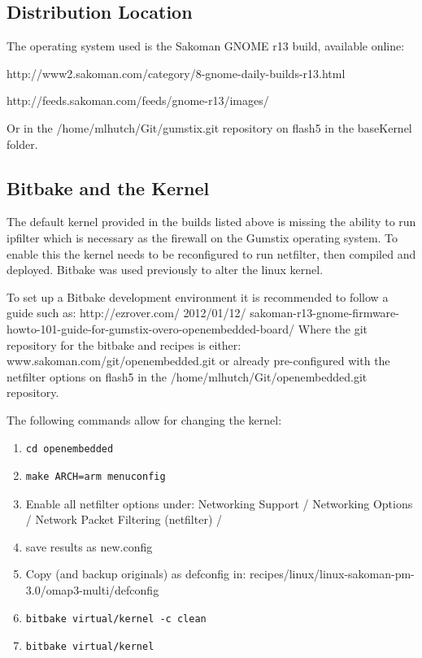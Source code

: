 \subsection{Distribution Location}
\label{app:gum:distribution}
The operating system used is the Sakoman GNOME r13 build, available online:

http://www2.sakoman.com/category/8-gnome-daily-builds-r13.html

http://feeds.sakoman.com/feeds/gnome-r13/images/

Or in the /home/mlhutch/Git/gumstix.git repository on flash5 in the baseKernel folder.

\subsection{Bitbake and the Kernel}

The default kernel provided in the builds listed above is missing the ability to run ipfilter which is necessary as the firewall on the Gumstix operating system.
To enable this the kernel needs to be reconfigured to run netfilter, then compiled and deployed.
Bitbake was used previously to alter the linux kernel.

To set up a Bitbake development environment it is recommended to follow a guide such as:
http://ezrover.com/ 2012/01/12/ sakoman-r13-gnome-firmware-howto-101-guide-for-gumstix-overo-openembedded-board/
Where the git repository for the bitbake and recipes is either:
www.sakoman.com/git/openembedded.git
or already pre-configured with the netfilter options on flash5 in the /home/mlhutch/Git/openembedded.git repository.

The following commands allow for changing the kernel:

\begin{enumerate}

\item \begin{verbatim}cd openembedded \end{verbatim}
\item \begin{verbatim}make ARCH=arm menuconfig \end{verbatim}

\item Enable all netfilter options under: Networking Support / Networking Options / Network Packet Filtering (netfilter) /

\item save results as new.config
\item Copy (and backup originals) as defconfig in: recipes/linux/linux-sakoman-pm-3.0/omap3-multi/defconfig

\item \begin{verbatim}bitbake virtual/kernel -c clean \end{verbatim}
\item \begin{verbatim}bitbake virtual/kernel \end{verbatim}

\end{enumerate}

